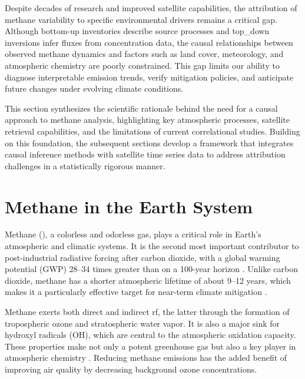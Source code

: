 \cleardoublepage
\label{chap:intro}




Despite decades of research and improved satellite capabilities, the attribution of methane variability to specific environmental drivers remains a critical gap. Although bottom-up inventories describe source processes and \gls{top_down} inversions infer fluxes from concentration data, the causal relationships between observed methane dynamics and factors such as land cover, meteorology, and atmospheric chemistry are poorly constrained. This gap limits our ability to diagnose interpretable emission trends, verify mitigation policies, and anticipate future changes under evolving climate conditions.

This section synthesizes the scientific rationale behind the need for a causal approach to methane analysis, highlighting key atmospheric processes, satellite retrieval capabilities, and the limitations of current correlational studies. Building on this foundation, the subsequent sections develop a framework that integrates causal inference methods with satellite time series data to address attribution challenges in a statistically rigorous manner.

\section{Methane in the Earth System}

Methane (), a colorless and odorless gas, plays a critical role in Earth's atmospheric and climatic systems. It is the second most important contributor to post-industrial radiative forcing after carbon dioxide, with a global warming potential (GWP) 28--34 times greater than  on a 100-year horizon \cite{tian_catalytic_2021, IPCC2013}. Unlike carbon dioxide, methane has a shorter atmospheric lifetime of about 9--12 years, which makes it a particularly effective target for near-term climate mitigation \cite{Shindell2012, Etminan2016}. 

Methane exerts both direct and indirect \gls{rf}, the latter through the formation of tropospheric ozone and stratospheric water vapor. It is also a major sink for hydroxyl radicals (OH), which are central to the atmospheric oxidation capacity. These properties make  not only a potent greenhouse gas but also a key player in atmospheric chemistry \cite{Shindell2012, Etminan2016}. Reducing methane emissions has the added benefit of improving air quality by decreasing background ozone concentrations.

